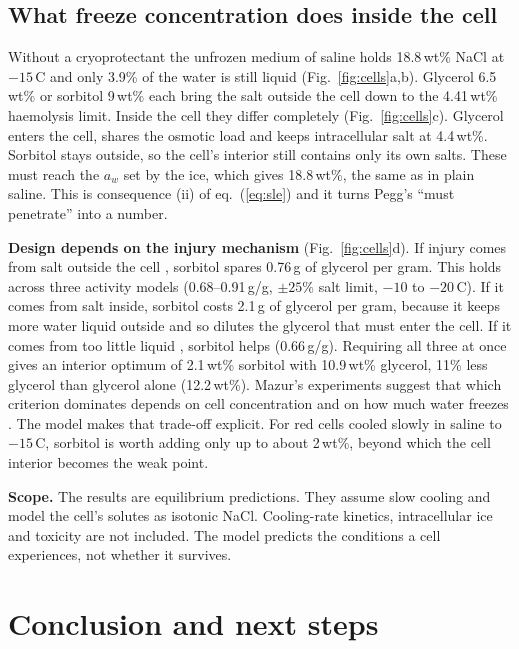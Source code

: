 \documentclass[10pt,a4paper,twocolumn]{article}
\begin{document}
\subsection{What freeze concentration does inside the cell}
Without a cryoprotectant the unfrozen medium of saline holds 18.8\,wt\% NaCl at $-15$\,\textdegree C and only
3.9\% of the water is still liquid (Fig.~\ref{fig:cells}a,b). Glycerol 6.5\,wt\% or sorbitol 9\,wt\% each bring
the salt outside the cell down to the 4.41\,wt\% haemolysis limit. Inside the cell they differ completely
(Fig.~\ref{fig:cells}c). Glycerol enters the cell, shares the osmotic load and keeps intracellular salt at
4.4\,wt\%. Sorbitol stays outside, so the cell's interior still contains only its own salts. These must reach
the $a_w$ set by the ice, which gives 18.8\,wt\%, the same as in plain saline. This is consequence (ii) of
eq.~(\ref{eq:sle}) and it turns Pegg's ``must penetrate'' \cite{pegg} into a number.

\textbf{Design depends on the injury mechanism} (Fig.~\ref{fig:cells}d). If injury comes from salt outside the
cell \cite{lovelock11}, sorbitol spares 0.76\,g of glycerol per gram. This holds across three activity models
(0.68--0.91\,g/g, $\pm25\%$ salt limit, $-10$ to $-20$\,\textdegree C). If it comes from salt inside, sorbitol
costs 2.1\,g of glycerol per gram, because it keeps more water liquid outside and so dilutes the glycerol that
must enter the cell. If it comes from too little liquid \cite{mazur81}, sorbitol helps (0.66\,g/g). Requiring
all three at once gives an interior optimum of 2.1\,wt\% sorbitol with 10.9\,wt\% glycerol, 11\% less glycerol
than glycerol alone (12.2\,wt\%). Mazur's experiments suggest that which criterion dominates depends on cell
concentration and on how much water freezes \cite{mazur81,mazur89}. The model makes that trade-off explicit.
For red cells cooled slowly in saline to $-15$\,\textdegree C, sorbitol is worth adding only up to about
2\,wt\%, beyond which the cell interior becomes the weak point.

\textbf{Scope.} The results are equilibrium predictions. They assume slow cooling and model the cell's solutes
as isotonic NaCl. Cooling-rate kinetics, intracellular ice and toxicity are not included. The model predicts
the conditions a cell experiences, not whether it survives.

\section{Conclusion and next steps}
\end{document}

